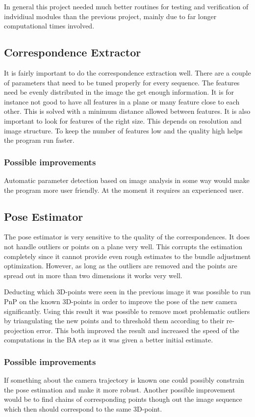 In general this project needed much better routines for testing and verification of indvidiual modules than the previous project, mainly due to far longer computational times involved.

\subsection{Correspondence Extractor}
It is fairly important to do the correspondence extraction well. There are a couple of parameters that need to be tuned properly for every sequence. The features need be evenly distributed in the image the get enough information. It is for instance not good to have all features in a plane or many feature close to each other. This is solved with a minimum distance allowed between features. It is also important to look for features of the right size. This depends on resolution and image structure. To keep the number of features low and the quality high helps the program run faster. 

\subsubsection{Possible improvements}
Automatic parameter detection based on image analysis in some way would make the program more user friendly. At the moment it requires an experienced user. 

\subsection{Pose Estimator}
The pose estimator is very sensitive to the quality of the correspondences. It does not handle outliers or points on a plane very well. This corrupts the estimation completely since it cannot provide even rough estimates to the bundle adjustment optimization. However, as long as the outliers are removed and the points are spread out in more than two dimensions it works very well. 

Deducting which 3D-points were seen in the previous image it was possible to run PnP on the known 3D-points in order to improve the pose of the new camera significantly. Using this result it was possible to remove most problematic outliers by triangulating the new points and to threshold them according to their re-projection error. This both improved the result and increased the speed of the computations in the BA step as it was given a better initial estimate.

\subsubsection{Possible improvements}
If something about the camera trajectory is known one could possibly constrain the pose estimation and make it more robust.
Another possible improvement would be to find chains of corresponding points though out the image sequence which then should correspond to the same 3D-point. 
\newpage

